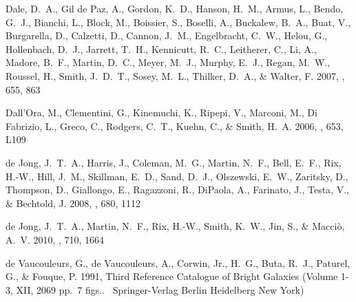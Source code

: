 \documentclass[manuscript]{aastex}
\begin{document}
\begin{thebibliography}{381}
{Dale}, D.~A., {Gil de Paz}, A., {Gordon}, K.~D., {Hanson}, H.~M., {Armus}, L.,
  {Bendo}, G.~J., {Bianchi}, L., {Block}, M., {Boissier}, S., {Boselli}, A.,
  {Buckalew}, B.~A., {Buat}, V., {Burgarella}, D., {Calzetti}, D., {Cannon},
  J.~M., {Engelbracht}, C.~W., {Helou}, G., {Hollenbach}, D.~J., {Jarrett},
  T.~H., {Kennicutt}, R.~C., {Leitherer}, C., {Li}, A., {Madore}, B.~F.,
  {Martin}, D.~C., {Meyer}, M.~J., {Murphy}, E.~J., {Regan}, M.~W., {Roussel},
  H., {Smith}, J.~D.~T., {Sosey}, M.~L., {Thilker}, D.~A., \& {Walter}, F.
  2007, \apj, 655, 863

{Dall'Ora}, M., {Clementini}, G., {Kinemuchi}, K., {Ripepi}, V., {Marconi}, M.,
  {Di Fabrizio}, L., {Greco}, C., {Rodgers}, C.~T., {Kuehn}, C., \& {Smith},
  H.~A. 2006, \apjl, 653, L109

{de Jong}, J.~T.~A., {Harris}, J., {Coleman}, M.~G., {Martin}, N.~F., {Bell},
  E.~F., {Rix}, H.-W., {Hill}, J.~M., {Skillman}, E.~D., {Sand}, D.~J.,
  {Olszewski}, E.~W., {Zaritsky}, D., {Thompson}, D., {Giallongo}, E.,
  {Ragazzoni}, R., {DiPaola}, A., {Farinato}, J., {Testa}, V., \& {Bechtold},
  J. 2008, \apj, 680, 1112

{de Jong}, J.~T.~A., {Martin}, N.~F., {Rix}, H.-W., {Smith}, K.~W., {Jin}, S.,
  \& {Macci{\`o}}, A.~V. 2010, \apj, 710, 1664

{de Vaucouleurs}, G., {de Vaucouleurs}, A., {Corwin}, Jr., H.~G., {Buta},
  R.~J., {Paturel}, G., \& {Fouque}, P. 1991, {Third Reference Catalogue of
  Bright Galaxies} (Volume 1-3, XII, 2069 pp.~7 figs..~ Springer-Verlag Berlin
  Heidelberg New York)


\end{thebibliography}
\end{document}
